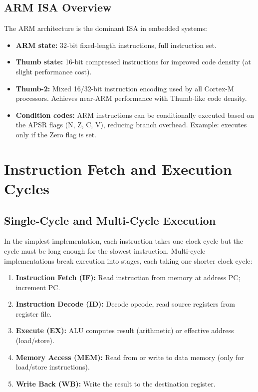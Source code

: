 \subsection{ARM ISA Overview}

The ARM architecture is the dominant ISA in embedded systems:
\begin{itemize}
  \item \textbf{ARM state:} 32-bit fixed-length instructions, full instruction set.
  \item \textbf{Thumb state:} 16-bit compressed instructions for improved code density (at slight performance cost).
  \item \textbf{Thumb-2:} Mixed 16/32-bit instruction encoding used by all Cortex-M processors. Achieves near-ARM performance with Thumb-like code density.
  \item \textbf{Condition codes:} ARM instructions can be conditionally executed based on the APSR flags (N, Z, C, V), reducing branch overhead. Example:  executes only if the Zero flag is set.
\end{itemize}

\section{Instruction Fetch and Execution Cycles}
\label{sec:arch:pipeline}

\subsection{Single-Cycle and Multi-Cycle Execution}

In the simplest implementation, each instruction takes one clock cycle but the cycle must be long enough for the slowest instruction. Multi-cycle implementations break execution into stages, each taking one shorter clock cycle:

\begin{enumerate}
  \item \textbf{Instruction Fetch (IF):} Read instruction from memory at address PC; increment PC.
  \item \textbf{Instruction Decode (ID):} Decode opcode, read source registers from register file.
  \item \textbf{Execute (EX):} ALU computes result (arithmetic) or effective address (load/store).
  \item \textbf{Memory Access (MEM):} Read from or write to data memory (only for load/store instructions).
  \item \textbf{Write Back (WB):} Write the result to the destination register.
\end{enumerate}

